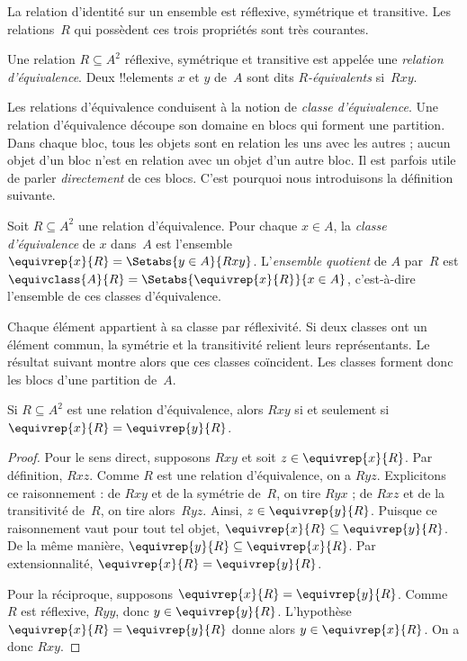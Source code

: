 \documentclass[../../../include/open-logic-section]{subfiles}
\begin{document}


La relation d’identité sur un ensemble est réflexive, symétrique et
transitive. Les relations~$R$ qui possèdent ces trois propriétés sont
très courantes.

\begin{defn}
Une relation $R \subseteq A^2$ réflexive, symétrique et transitive est
appelée une \emph{relation d’équivalence}. Deux !!{element}s $x$ et $y$
de~$A$ sont dits \emph{$R$-équivalents} si~$Rxy$.
\end{defn}

Les relations d’équivalence conduisent à la notion de \emph{classe
d’équivalence}. Une relation d’équivalence découpe son domaine en blocs
qui forment une partition.
%
Dans chaque bloc, tous les objets sont en relation les uns avec les autres ;
aucun objet d’un bloc n’est en relation avec un objet d’un autre bloc.
Il est parfois utile de parler \emph{directement} de ces blocs.
C’est pourquoi nous introduisons la définition suivante.

\begin{defn}
Soit $R \subseteq A^2$ une relation d’équivalence. Pour chaque $x \in A$,
la \emph{classe d’équivalence} de $x$ dans~$A$ est l’ensemble
$\equivrep{x}{R} = \Setabs{y \in A}{Rxy}$. L’\emph{ensemble quotient}
de $A$ par~$R$ est $\equivclass{A}{R} = \Setabs{\equivrep{x}{R}}{x \in A}$,
c’est-à-dire l’ensemble de ces classes d’équivalence.
\end{defn}

Chaque élément appartient à sa classe par réflexivité. Si deux classes ont un élément commun, la symétrie et la transitivité relient leurs représentants.
Le résultat suivant montre alors que ces classes coïncident. Les classes forment donc les blocs d'une partition de~$A$.

\begin{prop}
Si $R \subseteq A^2$ est une relation d’équivalence, alors $Rxy$ si et
seulement si $\equivrep{x}{R} = \equivrep{y}{R}$.
\end{prop}

\begin{proof}
Pour le sens direct, supposons $Rxy$ et soit $z \in \equivrep{x}{R}$.
Par définition, $Rxz$. Comme $R$ est une relation d’équivalence, on a $Ryz$.
Explicitons ce raisonnement : de $Rxy$ et de la symétrie de~$R$, on tire
$Ryx$ ; de $Rxz$ et de la transitivité de~$R$, on tire alors~$Ryz$.
Ainsi, $z \in \equivrep{y}{R}$. Puisque ce raisonnement vaut pour tout
tel objet, $\equivrep{x}{R} \subseteq \equivrep{y}{R}$. De la même manière,
$\equivrep{y}{R} \subseteq \equivrep{x}{R}$. Par extensionnalité,
$\equivrep{x}{R} = \equivrep{y}{R}$.

Pour la réciproque, supposons $\equivrep{x}{R} = \equivrep{y}{R}$.
Comme $R$ est réflexive, $Ryy$, donc $y \in \equivrep{y}{R}$.
L’hypothèse $\equivrep{x}{R} = \equivrep{y}{R}$ donne alors
$y \in \equivrep{x}{R}$. On a donc $Rxy$.
\end{proof}
\end{document}
